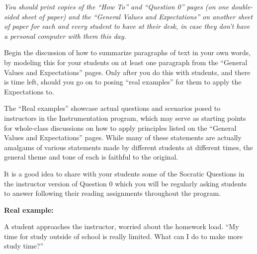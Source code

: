 












{\it You should print copies of the ``How To'' and ``Question 0'' pages (on one double-sided sheet of paper) and the ``General Values and Expectations'' on another sheet of paper for each and every student to have at their desk, in case they don't have a personal computer with them this day.}

\vskip 10pt

Begin the discussion of how to summarize paragraphs of text in your own words, by modeling this for your students on at least one paragraph from the ``General Values and Expectations'' pages.  Only after you do this with students, and there is time left, should you go on to posing ``real examples'' for them to apply the Expectations to.

\vskip 10pt

The ``Real examples'' showcase actual questions and scenarios posed to instructors in the Instrumentation program, which may serve as starting points for whole-class discussions on how to apply principles listed on the ``General Values and Expectations'' pages.  While many of these statements are actually amalgams of various statements made by different students at different times, the general theme and tone of each is faithful to the original.

\vskip 10pt

It is a good idea to share with your students some of the Socratic Questions in the instructor version of Question 0 which you will be regularly asking students to answer following their reading assignments throughout the program.










\vfil \eject
\noindent
{\bf Real example:} 

A student approaches the instructor, worried about the homework load.  ``My time for study outside of school is really limited.  What can I do to make more study time?''








